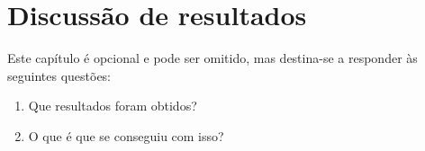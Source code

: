 \chapter{Discussão de resultados}
\label{cap:results}
Este capítulo é opcional e pode ser omitido, mas destina-se a responder às seguintes questões:
\begin{enumerate}
    \item Que resultados foram obtidos?
    \item O que é que se conseguiu com isso?
\end{enumerate}